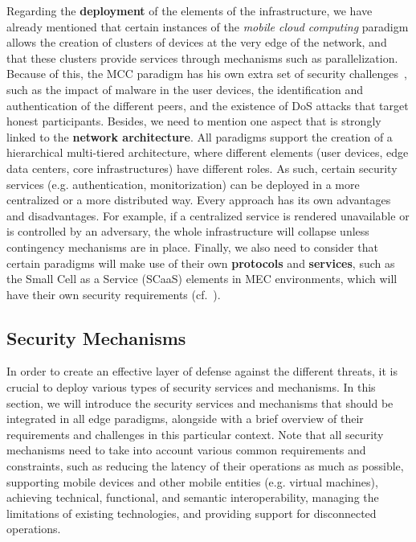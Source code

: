 \documentclass[twocolumn,preprint,3p]{elsarticle}
\begin{document}
Regarding the \textbf{deployment} of the elements of the infrastructure, we have already mentioned that certain instances of the \textit{mobile cloud computing} paradigm allows the creation of clusters of devices at the very edge of the network, and that these clusters provide services through mechanisms such as parallelization. Because of this, the MCC paradigm has his own extra set of security challenges~\cite{Suo13}, such as the impact of malware in the user devices, the identification and authentication of the different peers, and the existence of DoS attacks that target honest participants. Besides, we need to mention one aspect that is strongly linked to the \textbf{network architecture}. All paradigms support the creation of a hierarchical multi-tiered architecture, where different elements (user devices, edge data centers, core infrastructures) have different roles. As such, certain security services (e.g. authentication, monitorization) can be deployed in a more centralized or a more distributed way. Every approach has its own advantages and disadvantages. For example, if a centralized service is rendered unavailable or is controlled by an adversary, the whole infrastructure will collapse unless contingency mechanisms are in place. Finally, we also need to consider that certain paradigms will make use of their own \textbf{protocols} and \textbf{services}, such as the Small Cell as a Service (SCaaS) elements in MEC environments, which will have their own security requirements (cf.~\cite{Vassilakis2016}).

\subsection{Security Mechanisms}
\label{sec_thre::mech}

In order to create an effective layer of defense against the different threats, it is crucial to deploy various types of security services and mechanisms. In this section, we will introduce the security services and mechanisms that should be integrated in all edge paradigms, alongside with a brief overview of their requirements and challenges in this particular context. Note that all security mechanisms need to take into account various common requirements and constraints, such as reducing the latency of their operations as much as possible, supporting mobile devices and other mobile entities (e.g. virtual machines), achieving technical, functional, and semantic interoperability, managing the limitations of existing technologies, and providing support for disconnected operations.
\end{document}
